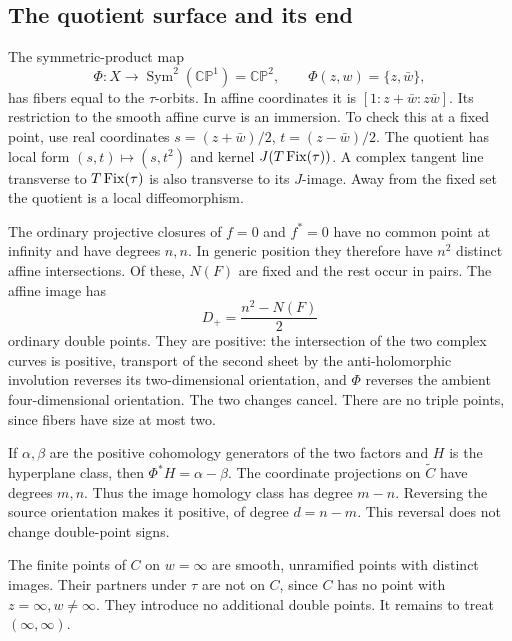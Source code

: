 \documentclass[UTF8,11pt]{ctexart}
\theoremstyle{definition}
\numberwithin{equation}{section}
\newcommand{\CP}{\mathbb {CP}}\newcommand{\cP}{\mathcal P}
\begin{document}
\subsection{The quotient surface and its end}\label{n:sec:surface}
The symmetric-product map
\[
 \Phi:X\longrightarrow\operatorname{Sym}^2(\CP^1)=\CP^2,
 \qquad \Phi(z,w)=\{z,\bar w\},
\]
has fibers equal to the $\tau$-orbits. In affine coordinates it is
$[1:z+\bar w:z\bar w]$. Its restriction to the smooth affine curve is an
immersion. To check this at a fixed point, use real coordinates
$s=(z+\bar w)/2$, $t=(z-\bar w)/2$. The quotient has local form
$(s,t)\mapsto(s,t^2)$ and kernel $J(T\operatorname{Fix}(\tau))$. A complex tangent line
transverse to $T\operatorname{Fix}(\tau)$ is also transverse to its $J$-image. Away from
the fixed set the quotient is a local diffeomorphism.

The ordinary projective closures of $f=0$ and $f^*=0$ have no common point
at infinity and have degrees $n,n$. In generic position they therefore
have $n^2$ distinct affine intersections. Of these, $N(F)$ are fixed and
the rest occur in pairs. The affine image has
\begin{equation}\label{n:eq:D}
 D_+=\frac{n^2-N(F)}2
\end{equation}
ordinary double points. They are positive: the intersection of the two
complex curves is positive, transport of the second sheet by the
anti-holomorphic involution reverses its two-dimensional orientation, and
$\Phi$ reverses the ambient four-dimensional orientation. The two changes
cancel. There are no triple points, since fibers have size at most two.

If $\alpha,\beta$ are the positive cohomology generators of the two factors
and $H$ is the hyperplane class, then $\Phi^*H=\alpha-\beta$. The coordinate
projections on $\widetilde C$ have degrees $m,n$. Thus the image homology
class has degree $m-n$. Reversing the source orientation makes it positive,
of degree $d=n-m$. This reversal does not change double-point signs.

The finite points of $C$ on $w=\infty$ are smooth, unramified points with
distinct images. Their partners under $\tau$ are not on $C$, since $C$
has no point with $z=\infty,w\ne\infty$. They introduce no additional
double points. It remains to treat $(\infty,\infty)$.
\end{document}
